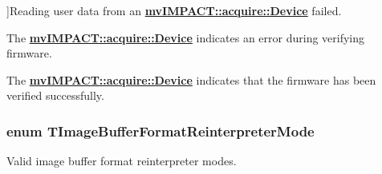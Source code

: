 \begin{Desc}
\begin{description}
{}]Reading user data from an {\bfseries \hyperlink{classmv_i_m_p_a_c_t_1_1acquire_1_1_device}{mv\+I\+M\+P\+A\+C\+T\+::acquire\+::\+Device}} failed. \item[{\em 
\hypertarget{group___common_interface_gga11e4aee028c717dbe4bd4a9e7d97832ea7f9bc0c88a2c2e39659769e6e9d507a7}{ur\+Verify\+F\+W\+Error}\label{group___common_interface_gga11e4aee028c717dbe4bd4a9e7d97832ea7f9bc0c88a2c2e39659769e6e9d507a7}
}]The {\bfseries \hyperlink{classmv_i_m_p_a_c_t_1_1acquire_1_1_device}{mv\+I\+M\+P\+A\+C\+T\+::acquire\+::\+Device}} indicates an error during verifying firmware. \item[{\em 
\hypertarget{group___common_interface_gga11e4aee028c717dbe4bd4a9e7d97832ead68c3d14b2037db39739d02d1e7ca6f1}{ur\+Verify\+F\+W\+O\+K}\label{group___common_interface_gga11e4aee028c717dbe4bd4a9e7d97832ead68c3d14b2037db39739d02d1e7ca6f1}
}]The {\bfseries \hyperlink{classmv_i_m_p_a_c_t_1_1acquire_1_1_device}{mv\+I\+M\+P\+A\+C\+T\+::acquire\+::\+Device}} indicates that the firmware has been verified successfully. \end{description}
\end{Desc}
\hypertarget{group___common_interface_ga077e155accbe145213c1c34895f961f2}{
\subsubsection[{T\+Image\+Buffer\+Format\+Reinterpreter\+Mode}]{\setlength{\rightskip}{0pt plus 5cm}enum {\bf T\+Image\+Buffer\+Format\+Reinterpreter\+Mode}}}\label{group___common_interface_ga077e155accbe145213c1c34895f961f2}


Valid image buffer format reinterpreter modes. 

